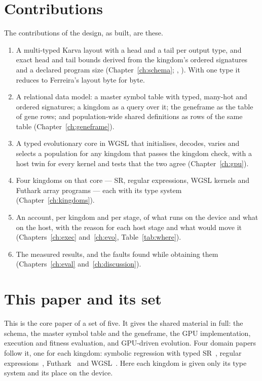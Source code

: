 \documentclass[11pt,a4paper]{report}
\newcommand{\src}[1]{{\footnotesize\path{#1}}}
\begin{document}
\section{Contributions}
\label{sec:contrib}

The contributions of the design, as built, are these.
\begin{enumerate}
\item A multi-typed Karva layout with a head and a tail per output type, and
exact head and tail bounds derived from the kingdom's ordered signatures and a
declared program size (Chapter~\ref{ch:schema};
\src{fuller/src/kingdom_contract.rs:326}, \src{:371}). With one type it reduces
to Ferreira's layout byte for byte.
\item A relational data model: a master symbol table with typed, many-hot and
ordered signatures; a kingdom as a query over it; the geneframe as the table of
gene rows; and population-wide shared definitions as rows of the same table
(Chapter~\ref{ch:geneframe}).
\item A typed evolutionary core in WGSL that initialises, decodes, varies and
selects a population for any kingdom that passes the kingdom check, with a host
twin for every kernel and tests that the two agree (Chapter~\ref{ch:gpu}).
\item Four kingdoms on that core --- SR, regular expressions, WGSL kernels and
Futhark array programs --- each with its type system (Chapter~\ref{ch:kingdoms}).
\item An account, per kingdom and per stage, of what runs on the device and
what on the host, with the reason for each host stage and what would move it
(Chapters~\ref{ch:exec} and~\ref{ch:evo}, Table~\ref{tab:where}).
\item The measured results, and the faults found while obtaining them
(Chapters~\ref{ch:eval} and~\ref{ch:discussion}).
\end{enumerate}

\section{This paper and its set}
This is the core paper of a set of five. It gives the shared material in full:
the schema, the master symbol table and the geneframe, the GPU implementation,
execution and fitness evaluation, and GPU-driven evolution. Four domain papers
follow it, one for each kingdom: symbolic regression with typed SR~\cite{tr_sr},
regular expressions~\cite{tr_regex}, Futhark~\cite{tr_futhark} and
WGSL~\cite{tr_wgsl}. Here each kingdom is given only its type system and its
place on the device.
\end{document}
